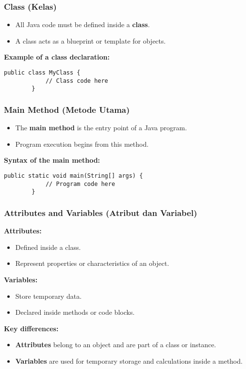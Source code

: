 \documentclass[aspectratio=169, table]{beamer}
\begin{document}
\begin{frame}[fragile]
	\frametitle{Class (\textbf{Kelas})}
	
	\begin{itemize}
		\item All Java code must be defined inside a \textbf{class}.
		\item A class acts as a blueprint or template for objects.
	\end{itemize}
	
	\textbf{Example of a class declaration:}
	
	\begin{lstlisting}[style=JavaStyle]
		public class MyClass {
			// Class code here
		}
	\end{lstlisting}
\end{frame}

\begin{frame}[fragile]
	\frametitle{Main Method (\textbf{Metode Utama})}
	
	\begin{itemize}
		\item The \textbf{main method} is the entry point of a Java program.
		\item Program execution begins from this method.
	\end{itemize}
	
	\textbf{Syntax of the main method:}
	
	\begin{lstlisting}[style=JavaStyle]
		public static void main(String[] args) {
			// Program code here
		}
	\end{lstlisting}
\end{frame}

\begin{frame}[fragile]
	\frametitle{Attributes and Variables (\textbf{Atribut dan Variabel})}
	
	\textbf{Attributes:}
	\begin{itemize}
		\item Defined inside a class.
		\item Represent properties or characteristics of an object.
	\end{itemize}
	
	\textbf{Variables:}
	\begin{itemize}
		\item Store temporary data.
		\item Declared inside methods or code blocks.
	\end{itemize}
	
	\textbf{Key differences:}
	\begin{itemize}
		\item \textbf{Attributes} belong to an object and are part of a class or instance.
		\item \textbf{Variables} are used for temporary storage and calculations inside a method.
	\end{itemize}
\end{frame}
\end{document}
